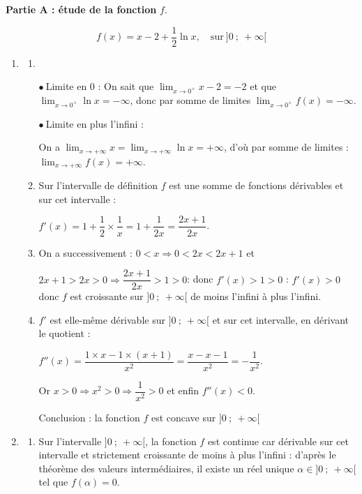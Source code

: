 \medskip

\textbf{Partie A : étude de la fonction} \boldmath $f$\unboldmath.

\medskip

\[f(x)  = x - 2 + \dfrac12 \ln x,\quad \text{sur}\:]0~;~+ \infty[\]

\begin{enumerate}
\item 
	\begin{enumerate}
		\item ~
		
$\bullet~$Limite en 0  : On sait que $\displaystyle\lim_{x \to 0^+} x - 2 = - 2$ et que $\displaystyle\lim_{x \to 0^+} \ln x = - \infty$, donc par somme de limites $\displaystyle\lim_{x \to 0^+} f(x) = - \infty$.

$\bullet~$Limite en plus l'infini : 

On a $\displaystyle\lim_{x \to + \infty} x = \displaystyle\lim_{x \to + \infty} \ln x = + \infty$, d'où par somme de limites : $\displaystyle\lim_{x \to + \infty} f(x) = + \infty$.
		\item Sur l'intervalle de définition $f$ est une somme de fonctions dérivables et sur cet intervalle : 
		
$f'(x) = 1 + \dfrac12 \times \dfrac 1x = 1 + \dfrac {1}{2x} = \dfrac{2x + 1}{2x}$.
		\item On a successivement : $0 < x \Rightarrow 0 < 2x < 2x + 1$ et 
		
		$2x + 1 > 2x > 0 \Rightarrow \dfrac{2x + 1}{2x} > 1 > 0 $: donc $f'(x) > 1 > 0$ : $f'(x) > 0$ donc $f$ est croissante sur $]0~;~+ \infty[$ de moins l'infini à plus l'infini.
		\item $f'$ est elle-même dérivable sur $]0~;~+ \infty[$ et sur cet intervalle, en dérivant le quotient :
		
$f''(x) = \dfrac{1 \times x - 1 \times (x + 1)}{x^2} = \dfrac{x - x - 1}{x^2} = - \dfrac{1}{x^2}$.
		
Or $x > 0 \Rightarrow x^2 > 0 \Rightarrow \dfrac{1}{x^2} > 0$ et enfin $f''(x) < 0$.
		
Conclusion : la fonction $f$ est concave sur $]0~;~+ \infty[$
	\end{enumerate}
\item 
	\begin{enumerate}
		\item  Sur l'intervalle $]0~;~+ \infty[$, la fonction $f$ est continue car dérivable sur cet intervalle et strictement croissante de moins à plus l'infini : d'après le théorème des valeurs intermédiaires, il existe un réel unique $\alpha \in]0~;~+ \infty[$ tel que $f(\alpha) = 0$.
		

\end{enumerate}
\end{enumerate}
